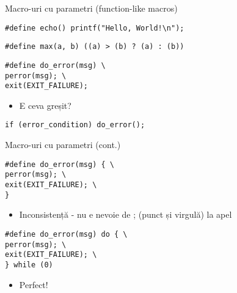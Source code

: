 \documentclass{beamer}
\begin{document}
\begin{frame}{Macro-uri cu parametri (function-like macros)}
			\begin{beamerboxesrounded}[lower=block body,shadow=true]{}
\texttt{\#define echo()  printf("Hello, World!\textbackslash{}n");}
			\end{beamerboxesrounded}
			\begin{beamerboxesrounded}[lower=block body,shadow=true]{}
\texttt{\#define max(a, b)   ((a) \textgreater{} (b) ? (a) : (b))}
			\end{beamerboxesrounded}
			\begin{beamerboxesrounded}[lower=block body,shadow=true]{}
\texttt{\#define do\_error(msg) \textbackslash{} \\
\hlstd{}\hlstd{\ \ \ \ \ \ \ \ }\hlstd{}perror(msg);	\textbackslash{} \\
\hlstd{}\hlstd{\ \ \ \ \ \ \ \ }\hlstd{}exit(EXIT\_FAILURE);
	}
			\end{beamerboxesrounded}
	\begin{itemize}
		\item E ceva greșit?
	\end{itemize}
			\begin{beamerboxesrounded}[lower=block body,shadow=true]{}
\texttt{if (error\_condition) do\_error();}
			\end{beamerboxesrounded}
\end{frame}

\begin{frame}{Macro-uri cu parametri (cont.)}
			\begin{beamerboxesrounded}[lower=block body,shadow=true]{}
\texttt{\#define do\_error(msg) \{ \textbackslash{} \\
\hlstd{}\hlstd{\ \ \ \ \ \ \ \ }\hlstd{}perror(msg);	\textbackslash{} \\
\hlstd{}\hlstd{\ \ \ \ \ \ \ \ }\hlstd{}exit(EXIT\_FAILURE); \textbackslash{} \\
\}
	}
			\end{beamerboxesrounded}
	\begin{itemize}
		\item Inconsistență - nu e nevoie de ; (punct și virgulă) la apel
	\end{itemize}
			\begin{beamerboxesrounded}[lower=block body,shadow=true]{}
\texttt{\#define do\_error(msg) do \{ \textbackslash{} \\
\hlstd{}\hlstd{\ \ \ \ \ \ \ \ }\hlstd{}perror(msg);	\textbackslash{} \\
\hlstd{}\hlstd{\ \ \ \ \ \ \ \ }\hlstd{}exit(EXIT\_FAILURE); \textbackslash{} \\
\} while (0)
	}
			\end{beamerboxesrounded}
	\begin{itemize}
		\item Perfect!
	\end{itemize}
\end{frame}
\end{document}
